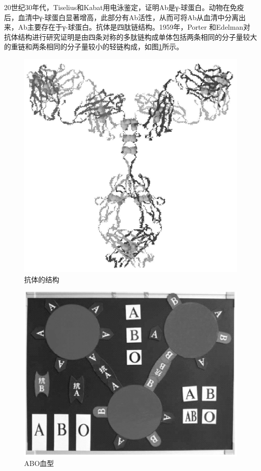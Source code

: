 20世纪30年代，Tiselius和Kabat用电泳鉴定，证明Ab是γ-球蛋白。动物在免疫后，血清中γ-球蛋白显著增高，此部分有Ab活性，从而可将Ab从血清中分离出来，Ab主要存在于γ-球蛋白。抗体是四肽链结构。1959年，Porter
和Edelman对抗体结构进行研究证明是由四条对称的多肽链构成单体包括两条相同的分子量较大的重链和两条相同的分子量较小的轻链构成，如图\ref{fig1-5}所示。

\begin{figure}[!htbp]
 \centering
 \includegraphics[scale=1.2]{./images/Image00012.jpg}
 \caption{抗体的结构}
 \label{fig1-5}
  \end{figure} 

\begin{figure}[!htbp]
 \centering
 \includegraphics{./images/Image00013.jpg}
 \caption{ABO血型}
 \label{fig1-6}
  \end{figure} 

